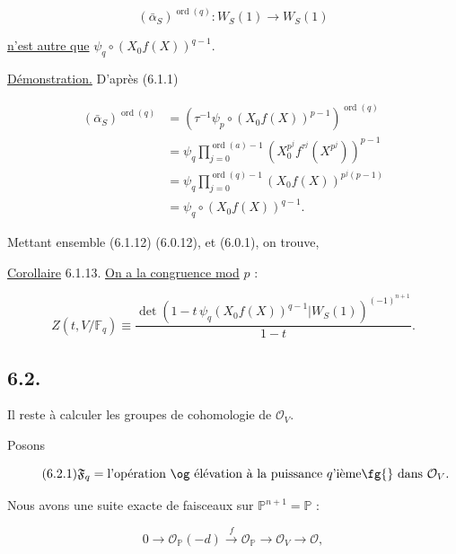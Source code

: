 \[
(\bar\alpha_S)^{\operatorname{ord}(q)}:W_S(1)\longrightarrow W_S(1)
\]

\noindent
\underline{n'est autre que} $\psi_q\circ(X_0f(X))^{q-1}$.


\underline{Démonstration.}
D'après (6.1.1)

\begin{equation*}
\begin{aligned}
(\bar\alpha_S)^{\operatorname{ord}(q)}
&=
\left(
\tau^{-1}\psi_p\circ(X_0f(X))^{p-1}
\right)^{\operatorname{ord}(q)}\\
&=
\psi_q
\prod_{j=0}^{\operatorname{ord}(a)-1}
\left(X_0^{p^j}f^{\tau^j}(X^{p^j})\right)^{p-1}\\
&=
\psi_q
\prod_{j=0}^{\operatorname{ord}(q)-1}
(X_0f(X))^{p^j(p-1)}\\
&=\psi_q\circ(X_0f(X))^{q-1}.
\end{aligned}
\end{equation*}

Mettant ensemble (6.1.12) (6.0.12), et (6.0.1), on trouve,

\underline{Corollaire} 6.1.13.
\underline{On a la congruence mod} $p$ :

\begin{equation*}
Z(t,V/\mathbb F_q)
\equiv
\frac{
\det\!\left(
1-t\,\psi_q(X_0f(X))^{q-1}
\mathrel{\Big|}W_S(1)
\right)^{(-1)^{n+1}}
}{1-t}.
\end{equation*}

\subsection*{6.2.}
Il reste à calculer les groupes de cohomologie de $\mathcal O_V$.

Posons

\begin{equation}\tag{6.2.1}
\mathfrak F_q
=\text{l'opération \og élévation à la puissance $q$'ième\fg{} dans $\mathcal O_V$}.
\end{equation}

Nous avons une suite exacte de faisceaux sur
$\mathbb P^{n+1}=\mathbb P$ :

\begin{equation}\tag{6.2.2}
0\longrightarrow\mathcal O_{\mathbb P}(-d)
\xrightarrow{\,f\,}\mathcal O_{\mathbb P}
\longrightarrow\mathcal O_V\longrightarrow\mathcal O,
\end{equation}

